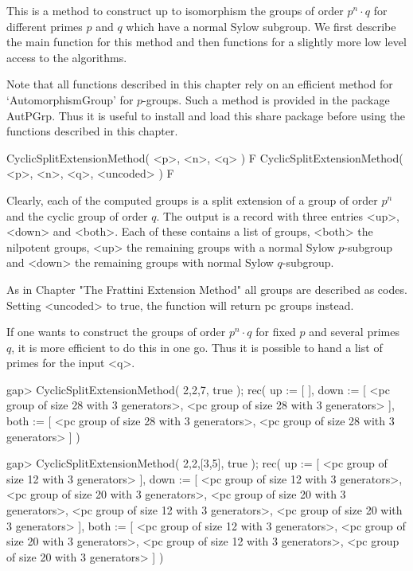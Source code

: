 


This is a method to construct up to isomorphism the groups of order
$p^n \cdot q$ for different primes $p$ and $q$ which have a normal
Sylow subgroup. We first describe the main function for this method
and then functions for a slightly more low level access to the
algorithms.

Note that all functions described in this chapter rely on an
efficient method for `AutomorphismGroup' for $p$-groups. Such
a method is provided in the package AutPGrp.
Thus it is useful to install and load this share package before
using the functions described in this chapter.


\> CyclicSplitExtensionMethod( <p>, <n>, <q> ) F
\> CyclicSplitExtensionMethod( <p>, <n>, <q>, <uncoded> ) F

Clearly, each of the computed groups is a split extension of a group
of order $p^n$ and the cyclic group of order $q$. The output is a
record with three entries <up>, <down> and <both>. Each of these
contains a list of groups, <both> the nilpotent groups, <up> the
remaining groups with a normal Sylow $p$-subgroup and <down> the
remaining groups with normal Sylow $q$-subgroup.

As in Chapter "The Frattini Extension Method" all groups are
described as codes. Setting <uncoded> to true, the function
will return pc groups instead.

If one wants to construct the groups of order $p^n \cdot q$
for fixed $p$ and several primes $q$, it is more efficient to
do this in one go. Thus it is possible to hand a list of primes
for the input <q>.

\beginexample
gap> CyclicSplitExtensionMethod( 2,2,7, true );
rec( up := [  ], 
  down  := [ <pc group of size 28 with 3 generators>, 
             <pc group of size 28 with 3 generators> ], 
  both  := [ <pc group of size 28 with 3 generators>, 
             <pc group of size 28 with 3 generators> ] )

gap> CyclicSplitExtensionMethod( 2,2,[3,5], true );
rec( up := [ <pc group of size 12 with 3 generators> ], 
  down  := [ <pc group of size 12 with 3 generators>, 
             <pc group of size 20 with 3 generators>, 
             <pc group of size 20 with 3 generators>, 
             <pc group of size 12 with 3 generators>, 
             <pc group of size 20 with 3 generators> ], 
  both  := [ <pc group of size 12 with 3 generators>, 
             <pc group of size 20 with 3 generators>, 
             <pc group of size 12 with 3 generators>, 
             <pc group of size 20 with 3 generators> ] )
\endexample

